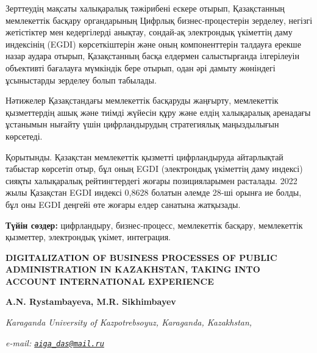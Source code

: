 Зерттеудің мақсаты халықаралық тәжірибені ескере отырып, Қазақстанның
мемлекеттік басқару органдарының Цифрлық бизнес-процестерін зерделеу,
негізгі жетістіктер мен кедергілерді анықтау, сондай-ақ электрондық
үкіметтің даму индексінің (EGDI) көрсеткіштерін және оның компоненттерін
талдауға ерекше назар аудара отырып, Қазақстанның басқа елдермен
салыстырғанда ілгерілеуін объективті бағалауға мүмкіндік бере отырып,
одан әрі дамыту жөніндегі ұсыныстарды зерделеу болып табылады.

Нәтижелер Қазақстандағы мемлекеттік басқаруды жаңғырту, мемлекеттік
қызметтердің ашық және тиімді жүйесін құру және елдің халықаралық
аренадағы ұстанымын нығайту үшін цифрландырудың стратегиялық
маңыздылығын көрсетеді.

Қорытынды. Қазақстан мемлекеттік қызметті цифрландыруда айтарлықтай
табыстар көрсетіп отыр, бұл оның EGDI (электрондық үкіметтің даму
индексі) сияқты халықаралық рейтингтердегі жоғары позицияларымен
расталады. 2022 жылы Қазақстан EGDI индексі 0,8628 болатын әлемде 28-ші
орынға ие болды, бұл оны EGDI деңгейі өте жоғары елдер санатына
жатқызады.

{\bfseries Түйін сөздер:} цифрландыру, бизнес-процесс, мемлекеттік басқару,
мемлекеттік қызметтер, электрондық үкімет, интеграция.

\begin{articleheader}
{\bfseries DIGITALIZATION OF BUSINESS PROCESSES OF PUBLIC ADMINISTRATION IN KAZAKHSTAN, TAKING INTO ACCOUNT INTERNATIONAL EXPERIENCE}

{\bfseries  
A.N. Rystambayeva\textsuperscript{\envelope },  
M.R. Sikhimbayev}
\end{articleheader}

\begin{affiliation}
\emph{Karaganda University of Kazpotrebsoyuz, Karaganda, Kazakhstan,}

\emph{e-mail: \href{mailto:aiga_das@mail.ru}{\nolinkurl{aiga\_das@mail.ru}}}
\end{affiliation}

